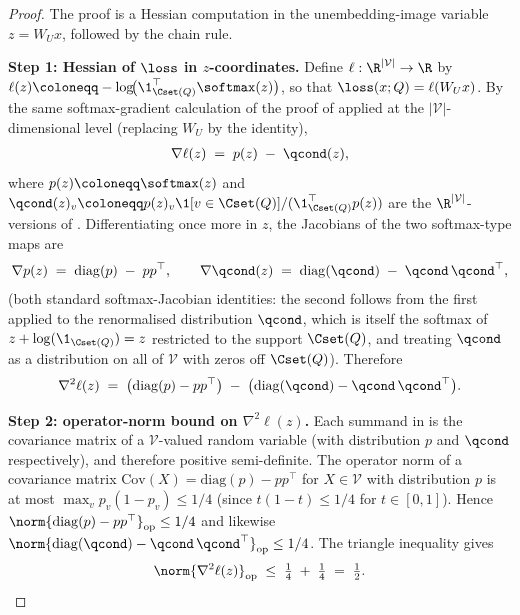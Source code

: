 \begin{proof}
The proof is a Hessian computation in the unembedding-image variable
$z = W_U x$, followed by the chain rule.

\noindent\textbf{Step 1: Hessian of $\loss$ in $z$-coordinates.}
Define $\ell: \R^{|\mathcal V|} \to \R$ by
$\ell(z) \coloneqq -\log\!\bigl(\1_{\Cset(Q)}^\top \softmax(z)\bigr)$, so
that $\loss(x; Q) = \ell(W_U x)$. By the same softmax-gradient calculation
of the proof of  applied at the
$|\mathcal V|$-dimensional level (replacing $W_U$ by the identity),
\begin{align*}
   \nabla \ell(z) \;=\; p(z) \;-\; \qcond(z),
\end{align*}
where $p(z) \coloneqq \softmax(z)$ and
$\qcond(z)_v \coloneqq p(z)_v \1[v \in \Cset(Q)] / (\1_{\Cset(Q)}^\top p(z))$
are the $\R^{|\mathcal V|}$-versions of .
Differentiating once more in $z$, the Jacobians of the two softmax-type
maps are
\begin{align*}
   \nabla p(z) \;=\; \mathrm{diag}(p) \;-\; p p^\top,
   \qquad
   \nabla \qcond(z) \;=\; \mathrm{diag}(\qcond) \;-\; \qcond\, \qcond^\top,
\end{align*}
(both standard softmax-Jacobian identities: the second follows from the
first applied to the renormalised distribution $\qcond$, which is itself
the softmax of $z + \log(\1_{\Cset(Q)}) = z$ restricted to the support
$\Cset(Q)$, and treating $\qcond$ as a distribution on all of $\mathcal V$
with zeros off $\Cset(Q)$). Therefore
\begin{align}\label{eq:Hess_ell}
   \nabla^2 \ell(z)
   \;=\; \bigl(\mathrm{diag}(p) - p p^\top\bigr)
       \;-\; \bigl(\mathrm{diag}(\qcond) - \qcond\, \qcond^\top\bigr).
\end{align}

\noindent\textbf{Step 2: operator-norm bound on $\nabla^2 \ell(z)$.}
Each summand in  is the covariance matrix of a
$\mathcal V$-valued random variable (with distribution $p$ and
$\qcond$ respectively), and therefore positive semi-definite. The
operator norm of a covariance matrix
$\mathrm{Cov}(X) = \mathrm{diag}(p) - p p^\top$ for $X \in \mathcal V$
with distribution $p$ is at most $\max_v p_v (1 - p_v) \le 1/4$
(since $t(1-t) \le 1/4$ for $t \in [0, 1]$). Hence
$\norm{\mathrm{diag}(p) - p p^\top}_{\mathrm{op}} \le 1/4$
and likewise
$\norm{\mathrm{diag}(\qcond) - \qcond\, \qcond^\top}_{\mathrm{op}} \le 1/4$.
The triangle inequality gives
\begin{align}\label{eq:Hess_ell_op_bound}
   \norm{\nabla^2 \ell(z)}_{\mathrm{op}}
   \;\le\; \tfrac{1}{4} \;+\; \tfrac{1}{4}
   \;=\; \tfrac{1}{2}.
\end{align}


\end{proof}
